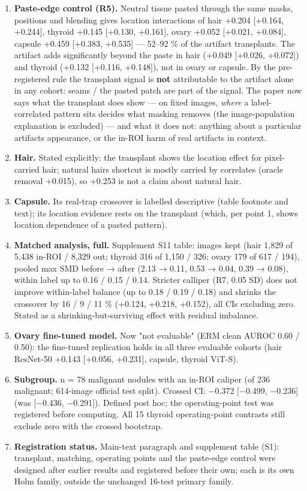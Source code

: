 {\begin{enumerate}
\item
  \textbf{Paste-edge control (R5).} Neutral tissue pasted through the same masks, positions and blending gives location
  interactions of hair +0.204 {[}+0.164, +0.244{]}, thyroid +0.145 {[}+0.130, +0.161{]}, ovary +0.052 {[}+0.021, +0.084{]},
  capsule +0.459 {[}+0.383, +0.535{]} --- 52--92 \% of the artifact transplant\textquotesingle s. The artifact adds significantly beyond the
  paste in hair (+0.049 {[}+0.026, +0.072{]}) and thyroid (+0.132 {[}+0.116, +0.148{]}), not in ovary or capsule. By the
  pre-registered rule the transplant signal is \textbf{not} attributable to the artifact alone in any cohort: seams / the
  pasted patch are part of the signal. The paper now says what the transplant does show --- on fixed images, \emph{where} a
  label-correlated pattern sits decides what masking removes (the image-population explanation is excluded) --- and what
  it does not: anything about a particular artifact\textquotesingle s appearance, or the in-ROI harm of real artifacts in context.
\item
  \textbf{Hair.} Stated explicitly: the transplant shows the location effect for pixel-carried hair; natural hair\textquotesingle s
  shortcut is mostly carried by correlates (oracle removal +0.015), so +0.253 is not a claim about natural hair.
\item
  \textbf{Capsule.} Its real-trap crossover is labelled descriptive (table footnote and text); its location evidence rests on
  the transplant (which, per point 1, shows location dependence of a pasted pattern).
\item
  \textbf{Matched analysis, full.} Supplement S11 table: images kept (hair 1,829 of 5,438 in-ROI / 8,329 out; thyroid 316
  of 1,150 / 326; ovary 179 of 617 / 194), pooled max \textbar SMD\textbar{} before → after (2.13 → 0.11, 0.53 → 0.04, 0.39 → 0.08),
  within label up to 0.16 / 0.15 / 0.14. Stricter calliper (R7, 0.05 SD) does not improve within-label balance (up to
  0.18 / 0.19 / 0.18) and shrinks the crossover by 16 / 9 / 11 \% (+0.124, +0.218, +0.152), all CIs excluding zero.
  Stated as a shrinking-but-surviving effect with residual imbalance.
\item
  \textbf{Ovary fine-tuned model.} Now "not evaluable" (ERM clean AUROC 0.60 / 0.50): the fine-tuned replication holds in
  all three evaluable cohorts (hair ResNet-50 +0.143 {[}+0.056, +0.231{]}, capsule, thyroid ViT-S).
\item
  \textbf{Subgroup.} n = 78 malignant nodules with an in-ROI caliper (of 236 malignant; 614-image official test split).
  Crossed CI: −0.372 {[}−0.499, −0.236{]} (was {[}−0.436, −0.291{]}). Defined post hoc; the operating-point test was registered
  before computing. All 15 thyroid operating-point contrasts still exclude zero with the crossed bootstrap.
\item
  \textbf{Registration status.} Main-text paragraph and supplement table (S1): transplant, matching, operating points and the
  paste-edge control were designed after earlier results and registered before their own; each is its own Holm family,
  outside the unchanged 16-test primary family.
\end{enumerate}

}
